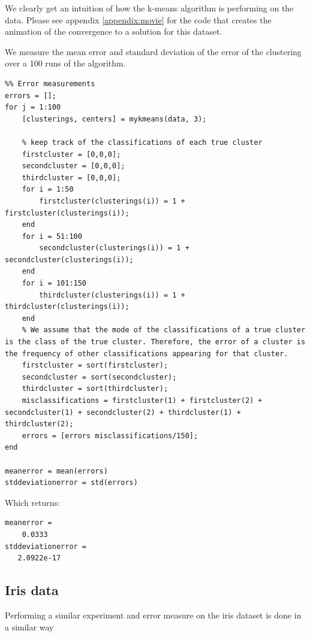 \documentclass[11pt]{article}
\begin{document}
    We clearly get an intuition of how the k-means algorithm is performing on the data. Please see appendix \ref{appendix:movie} for the code that creates the animation of the convergence to a solution for this dataset.
    \par We measure the mean error and standard deviation of the error of the clustering over a 100 runs of the algorithm.
    \begin{lstlisting}
%% Error measurements
errors = [];
for j = 1:100
    [clusterings, centers] = mykmeans(data, 3);
    
    % keep track of the classifications of each true cluster
    firstcluster = [0,0,0];
    secondcluster = [0,0,0];
    thirdcluster = [0,0,0];
    for i = 1:50
        firstcluster(clusterings(i)) = 1 + firstcluster(clusterings(i));
    end
    for i = 51:100
        secondcluster(clusterings(i)) = 1 + secondcluster(clusterings(i));
    end
    for i = 101:150
        thirdcluster(clusterings(i)) = 1 + thirdcluster(clusterings(i));
    end
    % We assume that the mode of the classifications of a true cluster is the class of the true cluster. Therefore, the error of a cluster is the frequency of other classifications appearing for that cluster.
    firstcluster = sort(firstcluster);
    secondcluster = sort(secondcluster);
    thirdcluster = sort(thirdcluster);
    misclassifications = firstcluster(1) + firstcluster(2) + secondcluster(1) + secondcluster(2) + thirdcluster(1) + thirdcluster(2);
    errors = [errors misclassifications/150];
end

meanerror = mean(errors)
stddeviationerror = std(errors)\end{lstlisting}
    
    Which returns:
    \begin{lstlisting}
meanerror =
    0.0333
stddeviationerror =
   2.0922e-17\end{lstlisting}
   
   \subsection{Iris data}
   
   Performing a similar experiment and error measure on the iris dataset is done in a similar way
   
\end{document}
